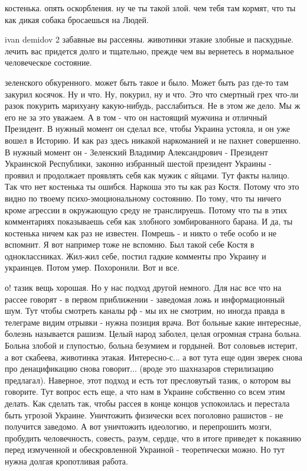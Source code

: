 костенька. опять оскорбления. ну че ты такой злой. чем тебя там кормят, что ты
как дикая собака бросаешься на Людей.

ivan demidov 2 забавные вы рассеяны. животинки этакие злобные и паскудные.
лечить вас придется долго и тщательно, прежде чем вы вернетесь в нормальное
человеческое состояние.

зеленского обкуренного. может быть такое и было. Может быть раз где-то там
закурил косячок. Ну и что. Ну, покурил, ну и что. Это что смертный грех что-ли
разок покурить марихуану какую-нибудь, расслабиться. Не в этом же дело. Мы ж
его не за это уважаем. А в том - что он настоящий мужчина и отличный Президент.
В нужный момент он сделал все, чтобы Украина устояла, и он уже вошел в Историю.
И как раз здесь никакой наркоманией и не пахнет совершенно. В нужный момент он
- Зеленский Владимир Александрович - Президент Украинской Республики, законно
избранный шестой президент Украины - проявил и продолжает проявлять себя как
мужик с яйцами. Тут факты налицо. Так что нет костенька ты ошибся. Наркоша это
ты как раз Костя. Потому что это видно по твоему психо-эмоциональному
состоянию. По тому, что ты ничего кроме агрессии в окружающую среду не
транслируешь. Потому что ты в этих комментариях показываешь себя как злобного
зомбированного барана. И да, ты костенька ничем как раз не известен. Помрешь -
и никто о тебе особо и не вспомнит. Я вот например тоже не вспомню. Был такой
себе Костя в одноклассниках. Жил-жил себе, постил гадкие комменты про Украину и
украинцев. Потом умер. Похоронили. Вот и все.

о! тазик вещь хорошая. Но у нас подход другой немного. Для нас все что на
рассее говорят - в первом приближении - заведомая ложь и информационный шум.
Тут чтобы смотреть каналы рф - мы их не смотрим, но иногда правда в телеграме
видим отрывки - нужна позиция врача. Вот больные какие интересные, болезнь
называется рашизм. Целый народ заболел, целая огромная страна больна. Больна
злобой и глупостью, больна безумием и гордыней. Вот соловьев истерит, а вот
скабеева, животинка этакая. Интересно-с... а вот тута еще один зверек снова про
денацификацию снова говорит... (вроде это шахназаров стерилизацию предлагал).
Наверное, этот подход и есть тот пресловутый тазик, о котором вы говорите. Тут
вопрос есть еще, а что нам в Украине собственно со всем этим делать. Как
сделать так, чтобы рассея в конце концов успокоилась и перестала быть угрозой
Украине. Уничтожить физически всех поголовно рашистов - не получится заведомо.
А вот уничтожить идеологию, и перепрошить мозги, пробудить человечность,
совесть, разум, сердце, что в итоге приведет к покаянию перед измученной и
обескровленной Украиной - теоретически можно. Но тут нужна долгая кропотливая
работа. 

